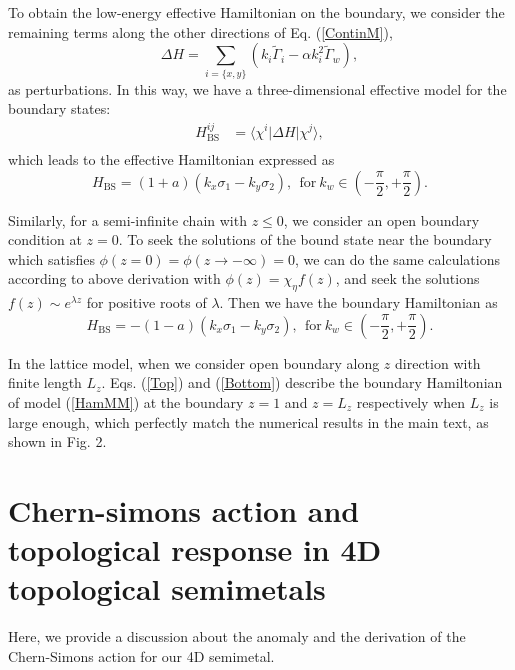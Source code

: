 \documentclass[twocolumn,prl,10pt,superscriptaddress]{revtex4}
\begin{document}
\begin{appendix}
To obtain the low-energy effective Hamiltonian on the boundary, we consider the remaining terms along the other directions of Eq. (\ref{ContinM}),
\begin{equation}
\Delta H=\sum_{i=\{x,y\}} \left(k_i\tilde{\Gamma}_i-\alpha k_i^2\tilde{\Gamma}_w\right),
\end{equation}
as perturbations. In this way, we have a three-dimensional effective model for the boundary states:
\begin{equation}
\begin{aligned}
H_{\text{BS}}^{ij}&=\langle\chi^i|\Delta H|\chi^j\rangle,\\
\end{aligned}
\end{equation}
which leads to the effective Hamiltonian expressed as
\begin{equation}\label{Top}
H_{\text{BS}}=(1+a)\left(k_x\sigma_1-k_y\sigma_2\right), ~~\text{for}~k_{w}\in (-\frac{\pi}{2},+\frac{\pi}{2}).
\end{equation}


Similarly, for a semi-infinite chain with $z\leq 0$, we consider an open boundary condition at $z=0$. To seek the solutions of the bound state near the boundary which satisfies $\phi(z=0)=\phi(z\rightarrow-\infty)=0$, we can do the same calculations according to above derivation with $\phi(z)=\chi_{\eta}f(z)$, and seek the solutions $f(z)\sim e^{\lambda z}$ for positive roots of $\lambda$.
Then we have the boundary Hamiltonian as
\begin{equation}\label{Bottom}
H_{\text{BS}}=-(1-a)\left(k_x\sigma_1-k_y\sigma_2\right), ~~\text{for}~k_{w}\in (-\frac{\pi}{2},+\frac{\pi}{2}).
\end{equation}

In the lattice model, when we consider open boundary along $z$ direction with finite length $L_z$. Eqs. (\ref{Top}) and (\ref{Bottom}) describe the boundary Hamiltonian of model (\ref{HamMM})  at the boundary $z=1$ and $z=L_z$  respectively  when $L_z$ is large enough, which perfectly match the numerical results in the main text, as shown in Fig. 2.




\section{Chern-simons action and topological response in 4D topological semimetals}
Here, we provide a discussion about the anomaly and the derivation of the Chern-Simons action for our 4D semimetal.


\end{appendix}
\end{document}
